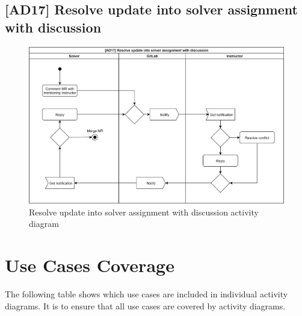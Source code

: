 \subsection{{[}AD17{]} Resolve update into solver assignment with discussion} \label{ssec:ad17}

\begin{figure}[H]
    \centering
    \includegraphics[width=\textwidth,height=\textheight,keepaspectratio]{Figures/ad/ad3.png}
    \caption{Resolve update into solver assignment with discussion activity diagram}
\end{figure}

\section{Use Cases Coverage} \label{sec:ucadc}

The following table shows which use cases are included in individual activity diagrams. It is to ensure that all use cases are covered by activity diagrams.

